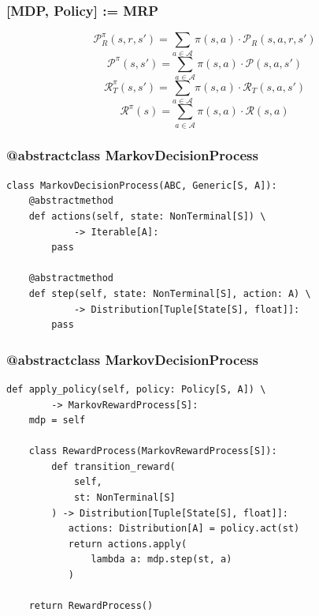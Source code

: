 \documentclass[handout]{beamer}
\begin{document}
\begin{frame}
\frametitle{[MDP, Policy] := MRP}
\pause
$$\mathcal{P}_R^{\pi}(s,r,s') = \sum_{a\in \mathcal{A}} \pi(s,a) \cdot \mathcal{P}_R(s,a,r,s')$$ 
\pause
$$\mathcal{P}^{\pi}(s,s') = \sum_{a\in \mathcal{A}} \pi(s,a) \cdot \mathcal{P}(s,a,s')$$
\pause
$$\mathcal{R}_T^{\pi}(s,s') = \sum_{a\in \mathcal{A}} \pi(s,a) \cdot \mathcal{R}_T(s,a,s')$$
\pause
$$\mathcal{R}^{\pi}(s) = \sum_{a\in \mathcal{A}} \pi(s,a) \cdot \mathcal{R}(s,a)$$
\end{frame}


\begin{frame}[fragile]
\frametitle{@abstractclass MarkovDecisionProcess}
\pause
\begin{lstlisting}
class MarkovDecisionProcess(ABC, Generic[S, A]):
    @abstractmethod
    def actions(self, state: NonTerminal[S]) \
            -> Iterable[A]:
        pass

    @abstractmethod
    def step(self, state: NonTerminal[S], action: A) \
            -> Distribution[Tuple[State[S], float]]:
        pass
\end{lstlisting}
\end{frame}


\begin{frame}[fragile]
\frametitle{@abstractclass MarkovDecisionProcess}
\pause
\begin{lstlisting}
def apply_policy(self, policy: Policy[S, A]) \
        -> MarkovRewardProcess[S]:
    mdp = self

    class RewardProcess(MarkovRewardProcess[S]):
        def transition_reward(
            self,
            st: NonTerminal[S]
        ) -> Distribution[Tuple[State[S], float]]:
           actions: Distribution[A] = policy.act(st)
           return actions.apply(
               lambda a: mdp.step(st, a)
           )
           
    return RewardProcess()        
\end{lstlisting}
\end{frame}
\end{document}
